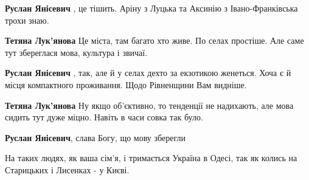 \begin{itemize}
\begin{itemize}
\textbf{Руслан Янісевич} , це тішить. Аріну з Луцька та Аксинію з Івано-Франківська трохи знаю.

 
\textbf{Тетяна Лук'янова} Це міста, там багато хто живе. По селах простіше. Але саме тут збереглася мова, культура і звичаї.

 
\textbf{Руслан Янісевич} , так, але й у селах дехто за екзотикою женеться. Хоча є й місця компактного проживання. Щодо Рівненщини Вам видніше.

 
\textbf{Тетяна Лук'янова} Ну якщо об'єктивно, то тенденції не надихають, але мова сидить тут дуже міцно. Навіть в часи совка так було.

 
\textbf{Руслан Янісевич}, слава Богу, що мову зберегли
\end{itemize}

 
На таких людях, як ваша сім'я, і тримається Україна в Одесі, так як колись на
Старицьких і Лисенках - у Києві.

 


\end{itemize}

